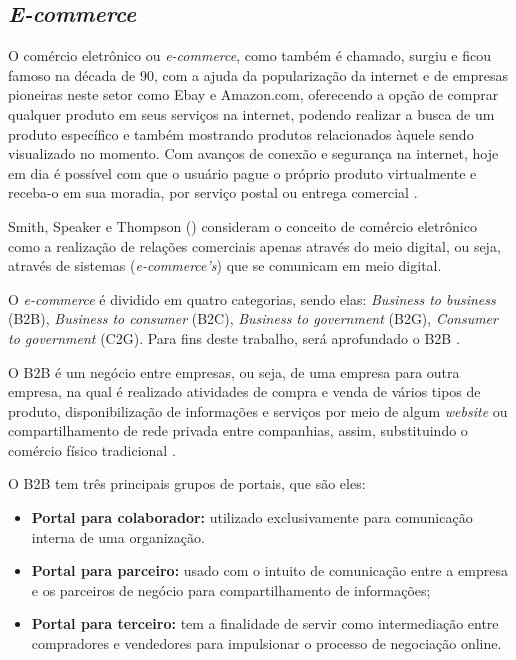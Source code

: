 \subsection{\textit{E-commerce}}

O comércio eletrônico ou \textit{e-commerce}, como também é chamado, surgiu e ficou famoso na década de 90, com a ajuda da popularização da internet e de empresas pioneiras neste setor como Ebay e Amazon.com, oferecendo a opção de comprar qualquer produto em seus serviços na internet, podendo realizar a busca de um produto específico e também mostrando produtos relacionados àquele sendo visualizado no momento. Com avanços de conexão e segurança na internet, hoje em dia é possível com que o usuário pague o próprio produto virtualmente e receba-o em sua moradia, por serviço postal ou entrega comercial \cite{Nakamura:2011}.

Smith, Speaker e Thompson (\citeyear{smith2000mais}) consideram o conceito de comércio eletrônico como a realização de relações comerciais apenas através do meio digital, ou seja, através de sistemas (\textit{e-commerce's}) que se comunicam em meio digital.

O \textit{e-commerce} é dividido em quatro categorias, sendo elas: \textit{Business to business} (B2B), \textit{Business to consumer} (B2C), \textit{Business to government} (B2G), \textit{Consumer to government} (C2G). Para fins deste trabalho, será aprofundado o B2B \cite{Nakamura:2011}.

O B2B é um negócio entre empresas, ou seja, de uma empresa para outra empresa, na qual é realizado atividades de compra e venda de vários tipos de produto, disponibilização de informações e serviços por meio de algum \textit{website} ou compartilhamento de rede privada entre companhias, assim, substituindo o comércio físico tradicional \cite{Nakamura:2011}.

O B2B tem três principais grupos de portais, que são eles:
\begin{itemize}
    \item \textbf{Portal para colaborador:} utilizado exclusivamente para comunicação interna de uma organização.
    
    \item \textbf{Portal para parceiro:} usado com o intuito de comunicação entre a empresa e os parceiros de negócio para compartilhamento de informações;
    
    \item \textbf{Portal para terceiro:} tem a finalidade de servir como intermediação entre compradores e vendedores para impulsionar o processo de negociação online.
    
\end{itemize}

